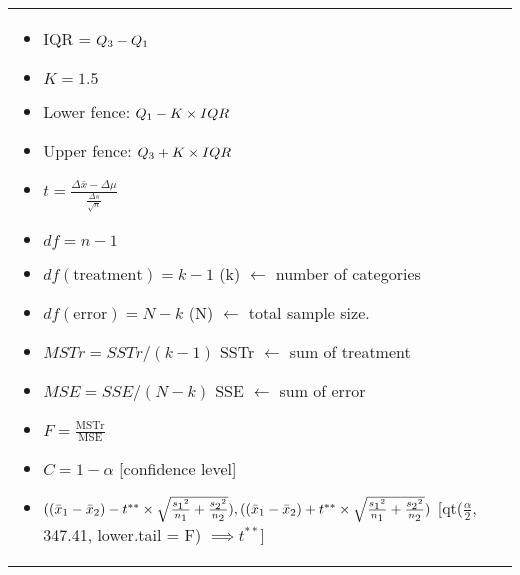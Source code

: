 \documentclass[6pt]{article}
\begin{document}
\begin{footnotesize}
\begin{scriptsize}
\begin{tabular}{l | l}
\parbox{0.5\textwidth}{
\begin{flushright}
\begin{itemize}
\setlength\itemsep{0.25em}
\item IQR = $Q\textsubscript{3} - Q\textsubscript{1}$
\item $K = 1.5$
\item Lower fence: $Q\textsubscript{1} - K \times IQR$
\item Upper fence: $Q\textsubscript{3} + K \times IQR$
\item $t = \frac{\Delta\bar{x} - \Delta\mu}{\frac{\Delta s}{\sqrt{n}}}$
\item $df = n-1$
\item $df(\text{treatment}) = k - 1$ (k) $\leftarrow$ number of categories
\item $df(\text{error}) = N - k$ (N) $\leftarrow$ total sample size.
\item $MSTr = SSTr/(k-1)$ SSTr $\leftarrow$ sum of treatment
\item $MSE = SSE/(N-k)$ SSE $\leftarrow$ sum of error
\item $F = \frac{\text{MSTr}}{\text{MSE}}$
\item $C = 1 - \alpha$ [confidence level]
\item $((\bar{x}\textsubscript{1} - \bar{x}\textsubscript{2}) - t^{\ast\ast} \times \sqrt{\frac{s\textsubscript{1}^2}{n\textsubscript{1}} + \frac{s\textsubscript{2}^2}{n\textsubscript{2}}}), ((\bar{x}\textsubscript{1} - \bar{x}\textsubscript{2}) + t^{\ast\ast} \times \sqrt{\frac{s\textsubscript{1}^2}{n\textsubscript{1}} + \frac{s\textsubscript{2}^2}{n\textsubscript{2}}})$ [qt($\frac{\alpha}{2}$, 347.41, lower.tail = F) $\implies t^{\ast\ast}$]


\end{itemize}
\end{flushright}
}

\end{tabular}
\end{scriptsize}
\end{footnotesize}
\end{document}
